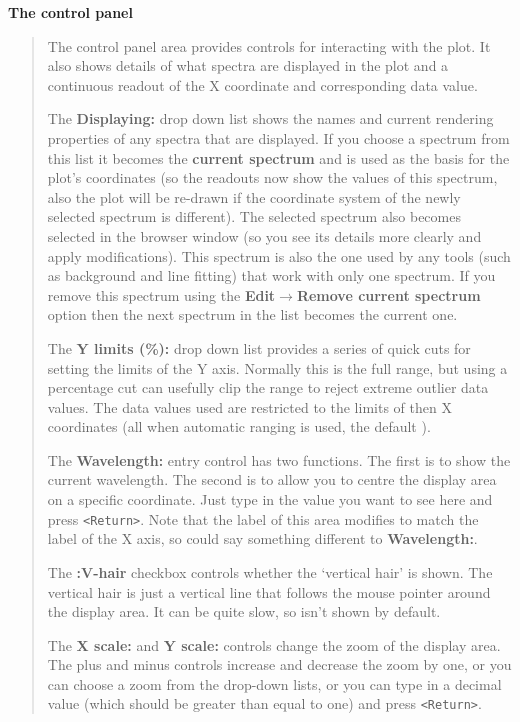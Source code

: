 \documentclass[twoside,11pt]{article}
\newcommand{\latexhtml}[2]{#1}
\renewcommand{\_}{\texttt{\symbol{95}}}
\newcommand{\submenuitem}[2]{\latexhtml{\textbf{#1$\rightarrow$#2}}{\textbf{#1->#2}}}
\newcommand{\labelitem}[1]{\textbf{#1}}
\newcommand{\hitext}[1]{\texttt{#1}}
\newcommand{\subheading}[1]{\textbf{\large{#1}}}
\begin{document}
\subheading{The control panel}
\begin{quote}
 The control panel area provides controls for interacting with the
 plot. It also shows details of what spectra are displayed in the plot
 and a continuous readout of the X coordinate and corresponding data
 value.

 The \labelitem{Displaying:} drop down list shows the names and current
 rendering properties of any spectra that are displayed. If you choose a
 spectrum from this list it becomes the \labelitem{current spectrum} and is
 used as the basis for the plot's coordinates (so the readouts now show the
 values of this spectrum, also the plot will be re-drawn if the coordinate
 system of the newly selected spectrum is different). The selected spectrum
 also becomes selected in the browser window (so you see its details more
 clearly and apply modifications). This spectrum is also the one used by any
 tools (such as background and line fitting) that work with only one
 spectrum. If you remove this spectrum using the \submenuitem{Edit}{Remove
 current spectrum} option then the next spectrum in the list becomes the
 current one.

 The \labelitem{Y limits (\%):} drop down list provides a series of
 quick cuts for setting the limits of the Y axis. Normally this is the
 full range, but using a percentage cut can usefully clip the range to
 reject extreme outlier data values. The data values used are restricted
 to the limits of then X coordinates (all when automatic ranging is used,
 the default ).

 The \labelitem{Wavelength:} entry control has two functions. The
 first is to show the current wavelength. The second is to allow you
 to centre the display area on a specific coordinate. Just type in the
 value you want to see here and press \hitext{<Return>}. Note that the
 label of this area modifies to match the label of the X axis, so
 could say something different to \labelitem{Wavelength:}.

 The \labelitem{:V-hair} checkbox controls whether the `vertical hair'
 is shown. The vertical hair is just a vertical line that follows the
 mouse pointer around the display area. It can be quite slow, so isn't
 shown by default.

 The \labelitem{X scale:} and \labelitem{Y scale:} controls change the
 zoom of the display area. The plus and minus controls increase and
 decrease the zoom by one, or you can choose a zoom from the drop-down
 lists, or you can type in a decimal value (which should be greater
 than equal to one) and press \hitext{<Return>}.


\end{quote}
\end{document}

